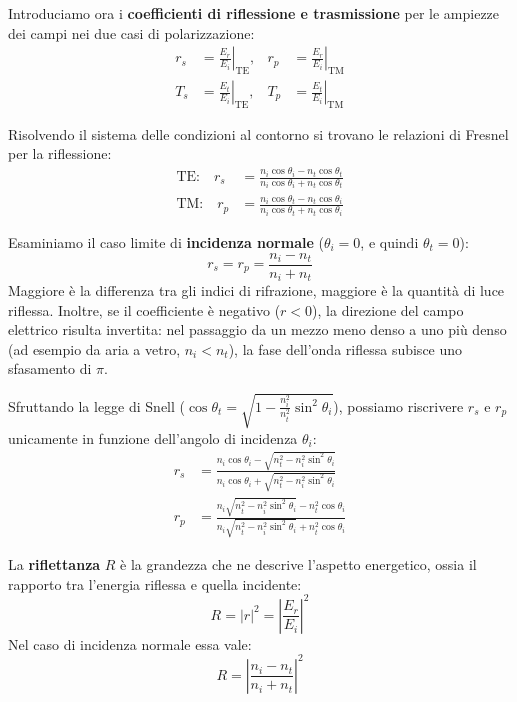 \documentclass[openany,a4paper,12pt]{book}
\begin{document}
Introduciamo ora i \textbf{coefficienti di riflessione e trasmissione} per le ampiezze dei campi nei due casi di polarizzazione:
\begin{align*}
    r_s &= \left.\frac{E_r}{E_i}\right|_{\text{TE}}, & r_p &= \left.\frac{E_r}{E_i}\right|_{\text{TM}} \\
    T_s &= \left.\frac{E_t}{E_i}\right|_{\text{TE}}, & T_p &= \left.\frac{E_t}{E_i}\right|_{\text{TM}}
\end{align*}

Risolvendo il sistema delle condizioni al contorno si trovano le relazioni di Fresnel per la riflessione:
\begin{align*}
    \text{TE:} \quad r_s &= \frac{n_i \cos\theta_i - n_t \cos\theta_t}{n_i \cos\theta_i + n_t \cos\theta_t} \\
    \text{TM:} \quad r_p &= \frac{n_i \cos\theta_t - n_t \cos\theta_i}{n_i \cos\theta_t + n_t \cos\theta_i}
\end{align*}

Esaminiamo il caso limite di \textbf{incidenza normale} ($\theta_i = 0$, e quindi $\theta_t = 0$):
\[
    r_s = r_p = \frac{n_i - n_t}{n_i + n_t}
\]
Maggiore è la differenza tra gli indici di rifrazione, maggiore è la quantità di luce riflessa. Inoltre, se il coefficiente è negativo ($r < 0$), la direzione del campo elettrico risulta invertita: nel passaggio da un mezzo meno denso a uno più denso (ad esempio da aria a vetro, $n_i < n_t$), la fase dell'onda riflessa subisce uno sfasamento di $\pi$.

Sfruttando la legge di Snell ($\cos\theta_t = \sqrt{1 - \frac{n_i^2}{n_t^2}\sin^2\theta_i}$), possiamo riscrivere $r_s$ e $r_p$ unicamente in funzione dell'angolo di incidenza $\theta_i$:
\begin{align*}
    r_s &= \frac{n_i \cos\theta_i - \sqrt{n_t^2 - n_i^2 \sin^2\theta_i}}{n_i \cos\theta_i + \sqrt{n_t^2 - n_i^2 \sin^2\theta_i}} \\
    r_p &= \frac{n_i \sqrt{n_t^2 - n_i^2 \sin^2\theta_i} - n_t^2 \cos\theta_i}{n_i \sqrt{n_t^2 - n_i^2 \sin^2\theta_i} + n_t^2 \cos\theta_i}
\end{align*}

\begin{definizione}[title=Riflettanza]
    La \textbf{riflettanza} $R$ è la grandezza che ne descrive l'aspetto energetico, ossia il rapporto tra l'energia riflessa e quella incidente:
    \[
        R = |r|^2 = \left|\frac{E_r}{E_i}\right|^2
    \]
    Nel caso di incidenza normale essa vale:
    \[
        R = \left|\frac{n_i - n_t}{n_i + n_t}\right|^2
    \]
\end{definizione}
\end{document}
